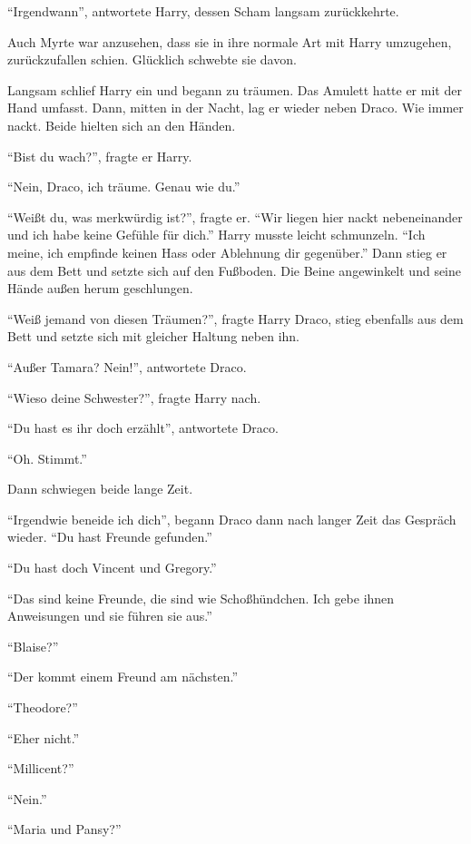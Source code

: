 \enquote{Irgendwann}, antwortete Harry, dessen Scham langsam zurückkehrte.

Auch Myrte war anzusehen, dass sie in ihre normale Art mit Harry umzugehen, zurückzufallen schien. Glücklich schwebte sie davon.

\trenn

Langsam schlief Harry ein und begann zu träumen. Das Amulett hatte er mit der Hand umfasst. Dann, mitten in der Nacht, lag er wieder neben Draco. Wie immer nackt. Beide hielten sich an den Händen.

\enquote{Bist du wach?}, fragte er Harry.

\enquote{Nein, Draco, ich träume. Genau wie du.}

\enquote{Weißt du, was merkwürdig ist?}, fragte er. \enquote{Wir liegen hier nackt nebeneinander und ich habe keine Gefühle für dich.} Harry musste leicht schmunzeln. \enquote{Ich meine, ich empfinde keinen Hass oder Ablehnung dir gegenüber.} Dann stieg er aus dem Bett und setzte sich auf den Fußboden. Die Beine angewinkelt und seine Hände außen herum geschlungen.

\enquote{Weiß jemand von diesen Träumen?}, fragte Harry Draco, stieg ebenfalls aus dem Bett und setzte sich mit gleicher Haltung neben ihn.

\enquote{Außer Tamara? Nein!}, antwortete Draco.

\enquote{Wieso deine Schwester?}, fragte Harry nach.

\enquote{Du hast es ihr doch erzählt}, antwortete Draco.

\enquote{Oh. Stimmt.}

Dann schwiegen beide lange Zeit.

\enquote{Irgendwie beneide ich dich}, begann Draco dann nach langer Zeit das Gespräch wieder. \enquote{Du hast Freunde gefunden.}

\enquote{Du hast doch Vincent und Gregory.}

\enquote{Das sind keine Freunde, die sind wie Schoßhündchen. Ich gebe ihnen Anweisungen und sie führen sie aus.}

\enquote{Blaise?}

\enquote{Der kommt einem Freund am nächsten.}

\enquote{Theodore?}

\enquote{Eher nicht.}

\enquote{Millicent?}

\enquote{Nein.}

\enquote{Maria und Pansy?}

